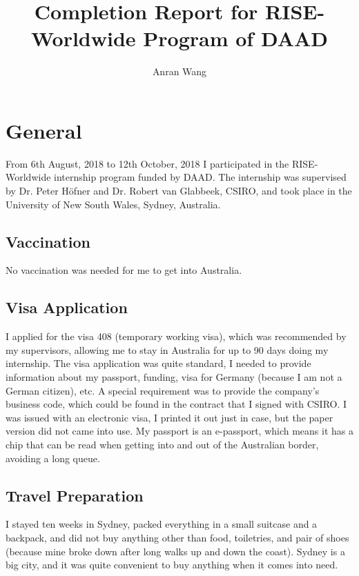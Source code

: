 \documentclass[adraft]{eptcs}
\begin{document}
\title{Completion Report for RISE-Worldwide Program of DAAD}
\def\titlerunning{Report}
\author{Anran Wang}
\def\authorrunning{Anran Wang}
\maketitle

\section{General}
From 6th August, 2018 to 12th October, 2018 I participated in the RISE-Worldwide internship program funded by DAAD. The internship was supervised by Dr. Peter H\"ofner and Dr. Robert van Glabbeek, CSIRO, and took place in the University of New South Wales, Sydney, Australia.

\subsection{Vaccination}
No vaccination was needed for me to get into Australia.

\subsection{Visa Application}
I applied for the visa 408 (temporary working visa), which was recommended by my supervisors, allowing me to stay in Australia for up to 90 days doing my internship. The visa application was quite standard, I needed to provide information about my passport, funding, visa for Germany (because I am not a German citizen), etc. A special requirement was to provide the company's business code, which could be found in the contract that I signed with CSIRO. I was issued with an electronic visa, I printed it out just in case, but the paper version did not came into use. My passport is an e-passport, which means it has a chip that can be read when getting into and out of the Australian border, avoiding a long queue.

\subsection{Travel Preparation}
I stayed ten weeks in Sydney, packed everything in a small suitcase and a backpack, and did not buy anything other than food, toiletries, and pair of shoes (because mine broke down after long walks up and down the coast). Sydney is a big city, and it was quite convenient to buy anything when it comes into need.
\end{document}

